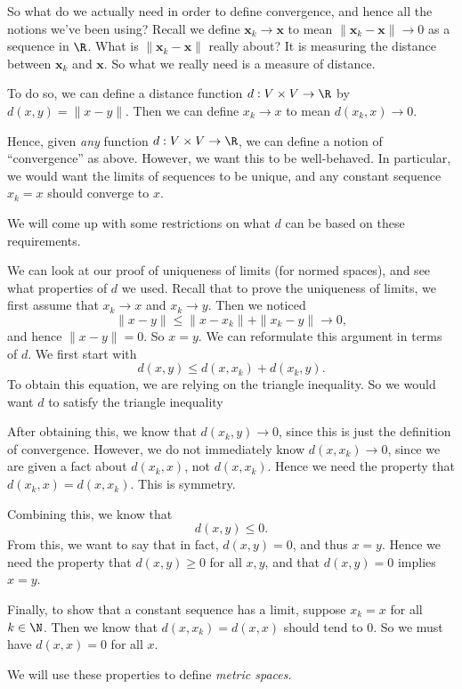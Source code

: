 \documentclass[a4paper]{article}
\begin{document}
So what do we actually need in order to define convergence, and hence all the notions we've been using? Recall we define $\mathbf{x}_k \to \mathbf{x}$ to mean $\|\mathbf{x}_k - \mathbf{x}\| \to 0$ as a sequence in $\R$. What is $\|\mathbf{x}_k - \mathbf{x}\|$ really about? It is measuring the distance between $\mathbf{x}_k$ and $\mathbf{x}$. So what we really need is a measure of distance.

To do so, we can define a distance function $d: V\times V \to \R$ by $d(x, y) = \|x - y\|$. Then we can define $x_k \to x$ to mean $d(x_k, x) \to 0$.

Hence, given \emph{any} function $d: V\times V \to \R$, we can define a notion of ``convergence'' as above. However, we want this to be well-behaved. In particular, we would want the limits of sequences to be unique, and any constant sequence $x_k = x$ should converge to $x$.

We will come up with some restrictions on what $d$ can be based on these requirements.

We can look at our proof of uniqueness of limits (for normed spaces), and see what properties of $d$ we used. Recall that to prove the uniqueness of limits, we first assume that $x_k \to x$ and $x_k \to y$. Then we noticed
\[
  \|x - y\| \leq \|x - x_k\| + \|x_k - y\| \to 0,
\]
and hence $\|x - y\| = 0$. So $x = y$. We can reformulate this argument in terms of $d$. We first start with
\[
  d(x, y) \leq d(x, x_k) + d(x_k, y).
\]
To obtain this equation, we are relying on the triangle inequality. So we would want $d$ to satisfy the triangle inequality

After obtaining this, we know that $d(x_k, y) \to 0$, since this is just the definition of convergence. However, we do not immediately know $d(x, x_k) \to 0$, since we are given a fact about $d(x_k, x)$, not $d(x, x_k)$. Hence we need the property that $d(x_k, x) = d(x, x_k)$. This is symmetry.

Combining this, we know that
\[
  d(x, y) \leq 0.
\]
From this, we want to say that in fact, $d(x, y) = 0$, and thus $x = y$. Hence we need the property that $d(x, y) \geq 0$ for all $x, y$, and that $d(x, y) = 0$ implies $x = y$.

Finally, to show that a constant sequence has a limit, suppose $x_k = x$ for all $k \in \N$. Then we know that $d(x, x_k) = d(x, x)$ should tend to $0$. So we must have $d(x, x) = 0$ for all $x$.

We will use these properties to define \emph{metric spaces}.
\end{document}
